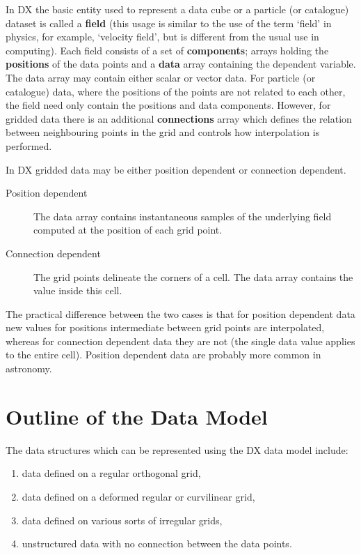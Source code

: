 \documentclass[twoside,11pt]{article}
\newcommand{\xlabel}[1]{}
\begin{document}
In DX the basic entity used to represent a data cube or a particle (or
catalogue) dataset is called a {\bf field} (this usage is similar to the
use of the term `field' in physics, for example, `velocity field', but
is different from the usual use in computing). Each field consists of a
set of {\bf components}; arrays holding the {\bf positions} of the data
points and a {\bf data} array containing the dependent variable. The
data array may contain either scalar or vector data. For particle (or
catalogue) data, where the positions of the points are not related to
each other, the field need only contain the positions and data
components. However, for gridded data there is an additional {\bf
connections} array which defines the relation between neighbouring
points in the grid and controls how interpolation is performed.

In DX gridded data may be either position dependent or connection
dependent.

\begin{description}

  \item[Position dependent] The data array contains instantaneous
   samples of the underlying field computed at the position of each
   grid point.

  \item[Connection dependent] The grid points delineate the corners
   of a cell. The data array contains the value inside this cell.

\end{description}

The practical difference between the two cases is that for position
dependent data new values for positions intermediate between grid points
are interpolated, whereas for connection dependent data they are not
(the single data value applies to the entire cell). Position dependent
data are probably more common in astronomy.


\section{\xlabel{OUTLINE}\label{OUTLINE}Outline of the Data Model}


The data structures which can be represented using the DX data model
include:

\begin{enumerate}

  \item data defined on a regular orthogonal grid,

  \item data defined on a deformed regular or curvilinear grid,

  \item data defined on various sorts of irregular grids,

  \item unstructured data with no connection between the data points.

\end{enumerate}
\end{document}
